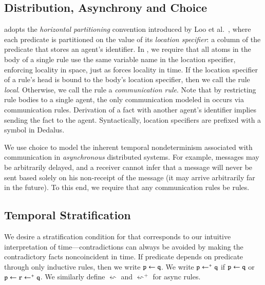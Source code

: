 


\subsection{Distribution, Asynchrony and Choice}

\lang adopts the {\em horizontal partitioning} convention introduced by Loo et
al.~\cite{Loo:2005}, where each predicate is partitioned on the value of its
{\em location specifier}: a column of the predicate that stores an agent's
identifier.  In \lang, we require that all atoms in the body of a single rule
use the same variable name in the location specifier, enforcing locality in
space, just as \lang forces locality in time.  If the location specifier of a
rule's head is bound to the body's location specifier, then we call the rule
{\em local}.  Otherwise, we call the rule a {\em communication rule}.  Note
that by restricting rule bodies to a single agent, the only communication
modeled in \lang occurs via communication rules.  Derivation of a fact with
another agent's identifier implies sending the fact to the agent.
Syntactically, location specifiers are prefixed with a \dedalus{\#} symbol in
Dedalus.

We use choice to model the inherent temporal nondeterminism associated with
communication in {\em asynchronous} distributed systems.  For example, messages
may be arbitrarily delayed, and a receiver cannot infer that a message will
never be sent based solely on his non-receipt of the message (it may arrive
arbitrarily far in the future).  To this end, we require that any communication
rules be  rules.  

\subsection{Temporal Stratification}

We desire a stratification condition for \lang that corresponds to our
intuitive interpretation of time---contradictions can always be avoided by
making the contradictory facts noncoincident in time. 
If predicate  depends on predicate  through only
inductive rules, then we write $\dedalus{p} \gets \dedalus{q}$.  We write
$\dedalus{p} \gets^+ \dedalus{q}$ if $\dedalus{p} \gets \dedalus{q}$ or
$\dedalus{p} \gets \dedalus{r} \gets^+ \dedalus{q}$.  We similarly define
$\leftsquigarrow$ and $\leftsquigarrow^+$ for async rules.

